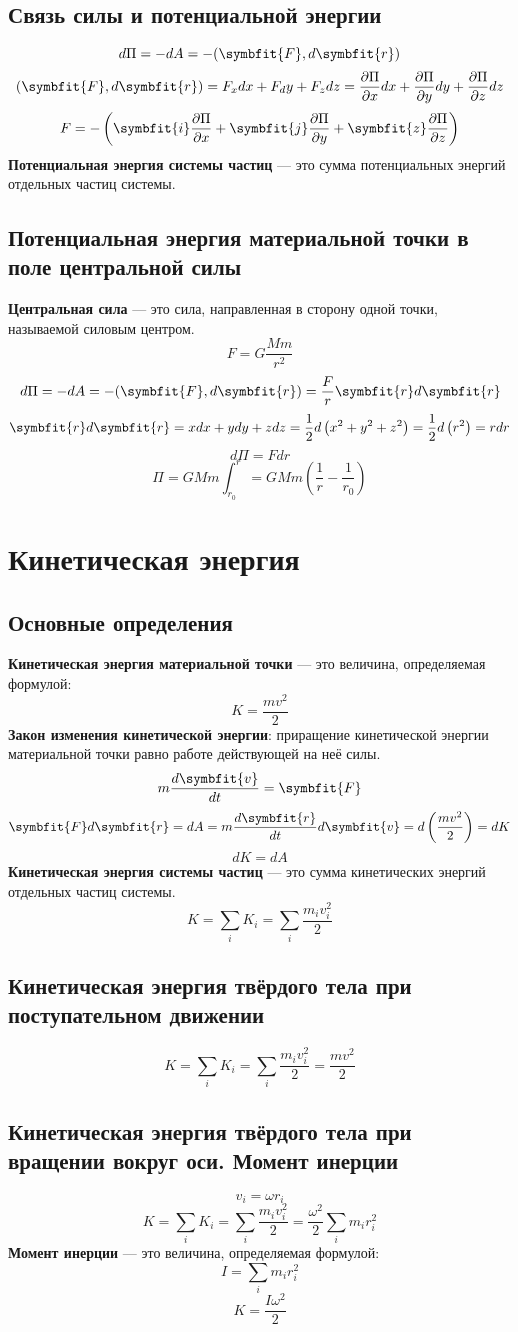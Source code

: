 \documentclass[fleqn,a4paper,12pt,titlepage,finall]{article}
\newcommand\vv[1]{\symbfit{#1}}
\begin{document}
\subsection{Связь силы и потенциальной энергии}
\[d\Pi = -dA = -(\vv{F}, d\vv{r})\]
\[(\vv{F}, d\vv{r}) = F_xdx+F_dy+F_zdz = \frac{\partial \Pi}{\partial x}dx +
\frac{\partial \Pi}{\partial y}dy + \frac{\partial \Pi}{\partial z}dz\]
\[F = -\left( \vv{i}\frac{\partial \Pi}{\partial x} +
\vv{j}\frac{\partial \Pi}{\partial y} + \vv{z}\frac{\partial \Pi}{\partial z}
\right)\]
{\bf Потенциальная энергия системы частиц} --- это сумма потенциальных энергий
отдельных частиц системы.
\subsection{Потенциальная энергия материальной точки в поле центральной силы}
{\bf Центральная сила} --- это сила, направленная в сторону одной точки,
называемой силовым центром.
\[F = G\frac{Mm}{r^2}\]
\[d\Pi = -dA = -(\vv{F}, d\vv{r}) = \frac{F}{r}\vv{r}d\vv{r}\]
\[\vv{r}d\vv{r} = xdx + ydy + zdz = \frac{1}{2}d\left(x^2+y^2+z^2\right) =
\frac{1}{2}d\left(r^2\right) = rdr\]
\[d\Pi = Fdr\]
\[\Pi = GMm\int_{r_0}^r = GMm\left(\frac{1}{r} - \frac{1}{r_0}\right)\]

\section{Кинетическая энергия}
\subsection{Основные определения}
{\bf Кинетическая энергия материальной точки} --- это величина, определяемая
формулой:
\[K = \frac{mv^2}{2}\]
{\bf Закон изменения кинетической энергии}: приращение кинетической энергии
материальной точки равно работе действующей на неё силы.
\[m\frac{d\vv{v}}{dt} = \vv{F}\]
\[\vv{F}d\vv{r} = dA = m\frac{d\vv{r}}{dt}d\vv{v} =
d\left(\frac{mv^2}{2}\right) = dK\]
\[\boxed{dK = dA}\]
{\bf Кинетическая энергия системы частиц} --- это сумма кинетических энергий
отдельных частиц системы.
\[K = \sum_iK_i = \sum_i\frac{m_iv_i^2}{2}\]
\subsection{Кинетическая энергия твёрдого тела при поступательном движении}
\[K = \sum_iK_i = \sum_i\frac{m_iv_i^2}{2} = \frac{mv^2}{2}\]
\subsection{Кинетическая энергия твёрдого тела при вращении вокруг оси. Момент
инерции}
\[v_i = \omega r_i\]
\[K = \sum_iK_i = \sum_i\frac{m_iv_i^2}{2} = \frac{\omega^2}{2}\sum_im_ir_i^2\]
{\bf Момент инерции} --- это величина, определяемая формулой:
\[I = \sum_im_ir_i^2\]
\[K = \frac{I\omega^2}{2}\]
\end{document}
